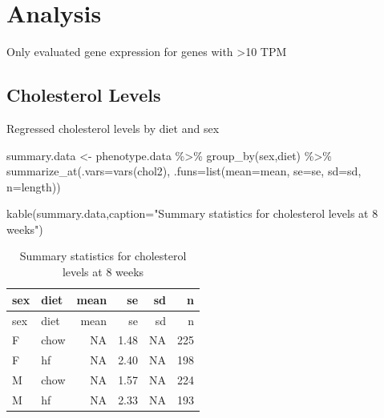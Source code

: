 \documentclass[
]{article}
\newenvironment{Shaded}{\begin{snugshade}}{\end{snugshade}}
\newcommand{\AttributeTok}[1]{\textcolor[rgb]{0.77,0.63,0.00}{#1}}
\newcommand{\FunctionTok}[1]{\textcolor[rgb]{0.00,0.00,0.00}{#1}}
\newcommand{\NormalTok}[1]{#1}
\newcommand{\OtherTok}[1]{\textcolor[rgb]{0.56,0.35,0.01}{#1}}
\newcommand{\SpecialCharTok}[1]{\textcolor[rgb]{0.00,0.00,0.00}{#1}}
\newcommand{\StringTok}[1]{\textcolor[rgb]{0.31,0.60,0.02}{#1}}
\begin{document}
\hypertarget{analysis}{%
\section{Analysis}\label{analysis}}

Only evaluated gene expression for genes with \textgreater10 TPM

\hypertarget{cholesterol-levels}{%
\subsection{Cholesterol Levels}\label{cholesterol-levels}}

Regressed cholesterol levels by diet and sex

\begin{Shaded}
\begin{Highlighting}[]
\NormalTok{summary.data }\OtherTok{\textless{}{-}}
\NormalTok{  phenotype.data }\SpecialCharTok{\%\textgreater{}\%}
  \FunctionTok{group\_by}\NormalTok{(sex,diet) }\SpecialCharTok{\%\textgreater{}\%}
  \FunctionTok{summarize\_at}\NormalTok{(}\AttributeTok{.vars=}\FunctionTok{vars}\NormalTok{(chol2), }\AttributeTok{.funs=}\FunctionTok{list}\NormalTok{(}\AttributeTok{mean=}\NormalTok{mean,}
                                             \AttributeTok{se=}\NormalTok{se,}
                                             \AttributeTok{sd=}\NormalTok{sd,}
                                             \AttributeTok{n=}\NormalTok{length))}

\FunctionTok{kable}\NormalTok{(summary.data,}\AttributeTok{caption=}\StringTok{"Summary statistics for cholesterol levels at 8 weeks"}\NormalTok{)}
\end{Highlighting}
\end{Shaded}

\begin{longtable}[]{@{}llrrrr@{}}
\caption{Summary statistics for cholesterol levels at 8
weeks}\tabularnewline
\toprule()
sex & diet & mean & se & sd & n \\
\midrule()
\endfirsthead
\toprule()
sex & diet & mean & se & sd & n \\
\midrule()
\endhead
F & chow & NA & 1.48 & NA & 225 \\
F & hf & NA & 2.40 & NA & 198 \\
M & chow & NA & 1.57 & NA & 224 \\
M & hf & NA & 2.33 & NA & 193 \\
\bottomrule()
\end{longtable}
\end{document}

